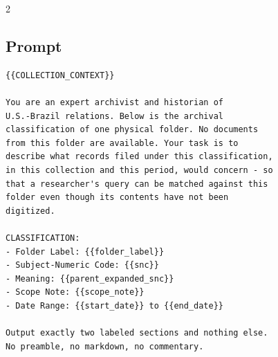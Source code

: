 \documentclass[a4paper,11pt]{article}
\begin{document}
\begin{multicols}{2}
\begin{center}
\end{center}

\subsection*{Prompt}

{\scriptsize
\begin{verbatim}
{{COLLECTION_CONTEXT}}

You are an expert archivist and historian of
U.S.-Brazil relations. Below is the archival
classification of one physical folder. No documents
from this folder are available. Your task is to
describe what records filed under this classification,
in this collection and this period, would concern - so
that a researcher's query can be matched against this
folder even though its contents have not been
digitized.

CLASSIFICATION:
- Folder Label: {{folder_label}}
- Subject-Numeric Code: {{snc}}
- Meaning: {{parent_expanded_snc}}
- Scope Note: {{scope_note}}
- Date Range: {{start_date}} to {{end_date}}

Output exactly two labeled sections and nothing else.
No preamble, no markdown, no commentary.


\end{verbatim}}
\end{multicols}
\end{document}
